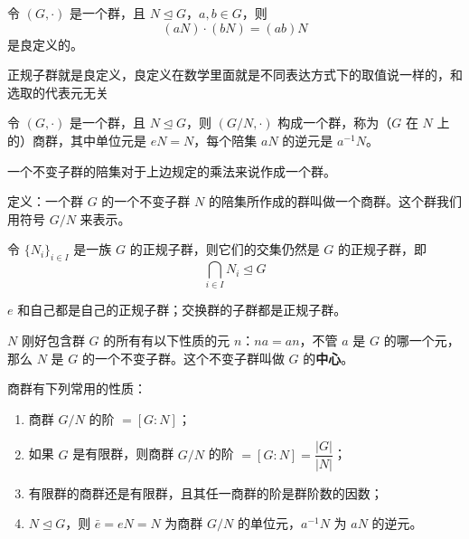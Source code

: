 \begin{proposition}[命题 1.36：良定义]
令 $(G,\cdot)$ 是一个群，且 $N\trianglelefteq G$，$a,b\in G$，则
\[
(aN)\cdot(bN)=(ab)N
\]
是良定义的。
\end{proposition}

\begin{note}[命题1 36良定义]
正规子群就是良定义，良定义在数学里面就是不同表达方式下的取值说一样的，和选取的代表元无关
\end{note}

\begin{proposition}[命题 1.37：商群]
令 $(G,\cdot)$ 是一个群，且 $N\trianglelefteq G$，则 $(G/N,\cdot)$ 构成一个群，称为（$G$ 在 $N$ 上的）商群，其中单位元是 $eN=N$，每个陪集 $aN$ 的逆元是 $a^{-1}N$。
\end{proposition}

\begin{theorem}[定理 3：不变子群的陪集叫商群]
一个不变子群的陪集对于上边规定的乘法来说作成一个群。

定义：一个群 $G$ 的一个不变子群 $N$ 的陪集所作成的群叫做一个商群。这个群我们用符号 $G/N$ 来表示。
\end{theorem}

\begin{proposition}[命题 1.38：正规子群的交集还是正规子群]
令 $\{N_i\}_{i\in I}$ 是一族 $G$ 的正规子群，则它们的交集仍然是 $G$ 的正规子群，即
\[
\bigcap_{i\in I}N_i\trianglelefteq G
\]
\end{proposition}

\begin{proposition}
$e$ 和自己都是自己的正规子群；交换群的子群都是正规子群。
\end{proposition}

\begin{example}[不变子群的中心]
$N$ 刚好包含群 $G$ 的所有有以下性质的元 $n$：$na=an$，不管 $a$ 是 $G$ 的哪一个元，那么 $N$ 是 $G$ 的一个不变子群。这个不变子群叫做 $G$ 的\textbf{中心}。
\end{example}

\begin{note}[商群性质]
商群有下列常用的性质：
\begin{enumerate}
  \item 商群 $G/N$ 的阶 $=[G:N]$；
  \item 如果 $G$ 是有限群，则商群 $G/N$ 的阶 $=[G:N]=\dfrac{|G|}{|N|}$；
  \item 有限群的商群还是有限群，且其任一商群的阶是群阶数的因数；
  \item $N\trianglelefteq G$，则 $\bar{e}=eN=N$ 为商群 $G/N$ 的单位元，$a^{-1}N$ 为 $aN$ 的逆元。
\end{enumerate}
\end{note}

